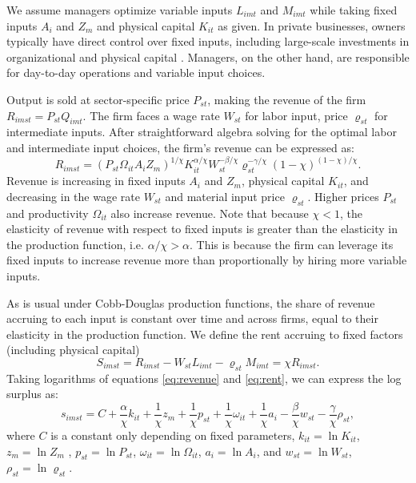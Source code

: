 \documentclass[11pt,a4paper]{article}
\begin{document}
We assume managers optimize variable inputs $L_{imt}$ and $M_{imt}$ while taking fixed inputs $A_{i}$ and $Z_m$ and physical capital $K_{it}$ as given. In private businesses, owners typically have direct control over fixed inputs, including large-scale investments in organizational and physical capital \citep{Navaretti2010EFIGE}. Managers, on the other hand, are responsible for day-to-day operations and variable input choices.

Output is sold at sector-specific price $P_{st}$, making the revenue of the firm $R_{imst} = P_{st}Q_{imt}$. The firm faces a wage rate $W_{st}$ for labor input, price $\varrho_{st}$ for intermediate inputs. After straightforward algebra solving for the optimal labor and intermediate input choices, the firm's revenue can be expressed as:
\begin{equation}\label{eq:revenue}
R_{imst} = (P_{st}\Omega_{it}A_i Z_m)^{1/\chi}
K_{it}^{\alpha/\chi}
W_{st}^{-\beta/\chi}
\varrho_{st}^{-\gamma/\chi}
(1-\chi)^{(1-\chi)/\chi}.
\end{equation}
Revenue is increasing in fixed inputs $A_i$ and $Z_m$, physical capital $K_{it}$, and decreasing in the wage rate $W_{st}$ and material input price $\varrho_{st}$. Higher prices $P_{st}$ and productivity $\Omega_{it}$ also increase revenue. Note that because $\chi<1$, the elasticity of revenue with respect to fixed inputs is greater than the elasticity in the production function, i.e. $\alpha/\chi > \alpha$. This is because the firm can leverage its fixed inputs to increase revenue more than proportionally by hiring more variable inputs.

As is usual under Cobb-Douglas production functions, the share of revenue accruing to each input is constant over time and across firms, equal to their elasticity in the production function. We define the rent accruing to fixed factors (including physical capital) 
\begin{equation}\label{eq:rent}
S_{imst} = R_{imst} - W_{st}L_{imt} - \varrho_{st}M_{imt} = \chi R_{imst}.
\end{equation}
Taking logarithms of equations \eqref{eq:revenue} and \eqref{eq:rent}, we can express the log surplus as:      
\begin{equation}\label{eq:log_surplus}
s_{imst} = C+\frac\alpha\chi k_{it} + \frac1\chi {z}_{m} + \frac1\chi p_{st} + \frac1\chi{\omega}_{it}+\frac1\chi a_i 
- \frac\beta\chi w_{st} - \frac\gamma\chi \rho_{st},
\end{equation}
where $C$ is a constant only depending on fixed parameters, $k_{it} = \ln K_{it}$, ${z}_{m} = \ln Z_m$ , $ p_{st} = \ln P_{st}$, ${\omega}_{it} = \ln\Omega_{it}$, $a_i = \ln A_i$, and $w_{st} = \ln W_{st}$, $\rho_{st} = \ln \varrho_{st}$. 
\end{document}
